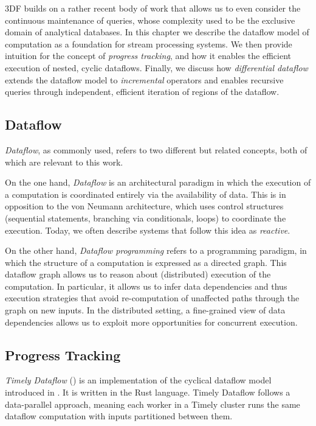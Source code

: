 \documentclass[../index.tex]{subfiles}
\begin{document}
3DF builds on a rather recent body of work that allows us to even
consider the continuous maintenance of queries, whose complexity used
to be the exclusive domain of analytical databases. In this chapter we
describe the dataflow model of computation as a foundation for
stream processing systems. We then provide intuition for the concept
of \emph{progress tracking}, and how it enables the efficient
execution of nested, cyclic dataflows. Finally, we discuss how
\emph{differential dataflow} extends the dataflow model to
\emph{incremental} operators and enables recursive queries through
independent, efficient iteration of regions of the dataflow.

\subsection{Dataflow}

\emph{Dataflow}, as commonly used, refers to two different but related
concepts, both of which are relevant to this work.

On the one hand, \emph{Dataflow} is an architectural paradigm in which
the execution of a computation is coordinated entirely via the
availability of data. This is in opposition to the von Neumann
architecture, which uses control structures (sequential statements,
branching via conditionals, loops) to coordinate the execution. Today,
we often describe systems that follow this idea as \emph{reactive}.

On the other hand, \emph{Dataflow programming} refers to a programming
paradigm, in which the structure of a computation is expressed as a
directed graph. This dataflow graph allows us to reason about
(distributed) execution of the computation. In particular, it allows
us to infer data dependencies and thus execution strategies that avoid
re-computation of unaffected paths through the graph on new inputs. In
the distributed setting, a fine-grained view of data dependencies
allows us to exploit more opportunities for concurrent execution.

\subsection{Progress Tracking}

\emph{Timely Dataflow} (\cite{timely}) is an implementation of the
cyclical dataflow model introduced in \cite{murray2013naiad}. It is
written in the Rust language. Timely Dataflow follows a data-parallel
approach, meaning each worker in a Timely cluster runs the same
dataflow computation with inputs partitioned between them.
\end{document}
